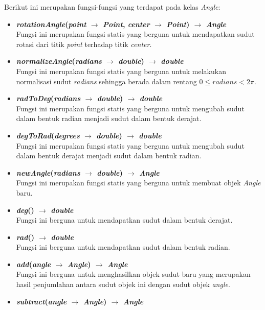 Berikut ini merupakan fungsi-fungsi yang terdapat pada kelas \textit{Angle}:
\begin{itemize}
	\item \textbf{\textit{rotationAngle}(\textit{point} \(\rightarrow\) \textit{Point}, \textit{center} \(\rightarrow\) \textit{Point}) \(\rightarrow\) \textit{Angle}}\\
	Fungsi ini merupakan fungsi statis yang berguna untuk mendapatkan sudut rotasi dari titik \textit{point} terhadap titik \textit{center}.
	\item \textbf{\textit{normalizeAngle}(\textit{radians} \(\rightarrow\) \textit{double}) \(\rightarrow\) \textit{double}}\\
	Fungsi ini merupakan fungsi statis yang berguna untuk melakukan normalisasi sudut \textit{radians} sehingga berada dalam rentang \(0\leq\textit{radians}<2\pi\).
	\item \textbf{\textit{radToDeg}(\textit{radians} \(\rightarrow\) \textit{double}) \(\rightarrow\) \textit{double}}\\
	Fungsi ini merupakan fungsi statis yang berguna untuk mengubah sudut dalam bentuk radian menjadi sudut dalam bentuk derajat.
	\item \textbf{\textit{degToRad}(\textit{degrees} \(\rightarrow\) \textit{double}) \(\rightarrow\) \textit{double}}\\
	Fungsi ini merupakan fungsi statis yang berguna untuk mengubah sudut dalam bentuk derajat menjadi sudut dalam bentuk radian.
	\item \textbf{\textit{newAngle}(\textit{radians} \(\rightarrow\) \textit{double}) \(\rightarrow\) \textit{Angle}}\\
	Fungsi ini merupakan fungsi statis yang berguna untuk membuat objek \textit{Angle} baru.
	\item \textbf{\textit{deg}() \(\rightarrow\) \textit{double}}\\
	Fungsi ini berguna untuk mendapatkan sudut dalam bentuk derajat.
	\item \textbf{\textit{rad}() \(\rightarrow\) \textit{double}}\\
	Fungsi ini berguna untuk mendapatkan sudut dalam bentuk radian.
	\item \textbf{\textit{add}(\textit{angle} \(\rightarrow\) \textit{Angle}) \(\rightarrow\) \textit{Angle}}\\
	Fungsi ini berguna untuk menghasilkan objek sudut baru yang merupakan hasil penjumlahan antara sudut objek ini dengan sudut objek \textit{angle}.
	\item \textbf{\textit{subtract}(\textit{angle} \(\rightarrow\) \textit{Angle}) \(\rightarrow\) \textit{Angle}}\\

\end{itemize}
